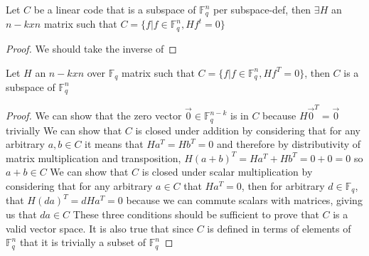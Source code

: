 \begin{lemma}
    Let $C$ be a linear code that is a subspace of $\mathbb{F}^{n}_{q}$ per subspace-def, then $\exists H$ an $n-kxn$ matrix such that $C=\{f | f\in \mathbb{F}^{n}_{q}, Hf^t=0\}$
\end{lemma}

\begin{proof}
    We should take the inverse of
\end{proof}

\begin{lemma}
    Let $H$ an $n-kxn$ over $\mathbb{F}_{q}$ matrix such that $C=\{f | f\in \mathbb{F}^{n}_{q}, Hf^T=0\}$, then $C$ is a subspace of $\mathbb{F}^{n}_{q}$
\end{lemma}

\begin{proof}
    We can show that the zero vector $\vec{0}\in \mathbb{F}^{n-k}_{q}$ is in $C$ because $H\vec{0}^T=\vec{0}$ trivially
    We can show that $C$ is closed under addition by considering that for any arbitrary $a,b\in C$ it means that
        $Ha^T=Hb^T=0$ and therefore by distributivity of matrix multiplication and transposition, $H(a+b)^T = Ha^T+Hb^T=0+0 = 0$ so $a+b\in C$
    We can show that $C$ is closed under scalar multiplication by considering that for any arbitrary $a\in C$ that
        $Ha^T=0$, then for arbitrary $d\in \mathbb{F}_{q}$, that $H(da)^T=dHa^T=0$ because we can commute scalars with matrices,
        giving us that $da\in C$
    These three conditions should be sufficient to prove that $C$ is a valid vector space.
    It is also true that since $C$ is defined in terms of elements of $\mathbb{F}^{n}_{q}$ that it is trivially a subset of $\mathbb{F}^{n}_{q}$
\end{proof}
